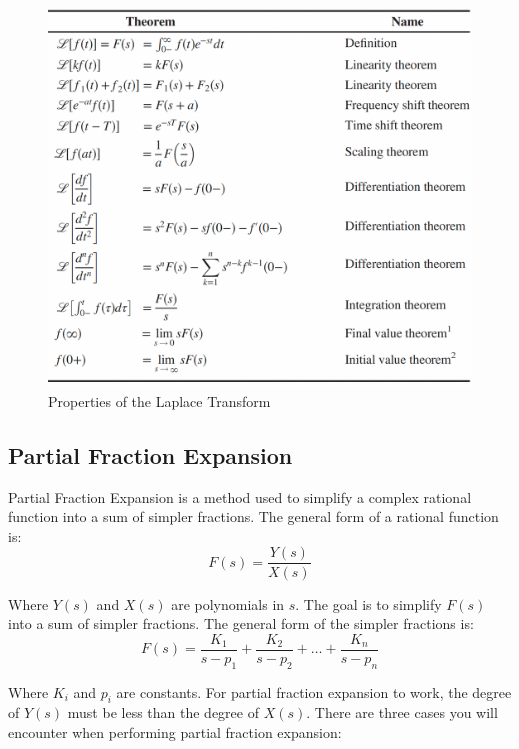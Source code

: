 \documentclass{article}
\theoremstyle{mytheoremstyle}
\theoremstyle{mytheoremstyle}
\theoremstyle{myproblemstyle}
\theoremstyle{break}
\begin{document}
\begin{figure}[h]
	\includegraphics[scale=0.2]{Laplace Transform Properties}
	\centering
	\caption{Properties of the Laplace Transform}
\end{figure}
\subsection{Partial Fraction Expansion}
Partial Fraction Expansion is a method used to simplify a complex rational function into a sum of simpler fractions. The general form of a rational function is:
\begin{equation}
	F(s) = \frac{Y(s)}{X(s)}
\end{equation}

Where $Y(s)$ and $X(s)$ are polynomials in $s$. The goal is to simplify $F(s)$ into a sum of simpler fractions. The general form of the simpler fractions is:
\begin{equation}
	F(s) = \frac{K_1}{s-p_1} + \frac{K_2}{s-p_2} + \ldots + \frac{K_n}{s-p_n}
\end{equation}

Where $K_i$ and $p_i$ are constants. For partial fraction expansion to work, the degree of $Y(s)$ must be less than the degree of $X(s)$. There are three cases you will encounter when performing partial fraction expansion:
\end{document}
